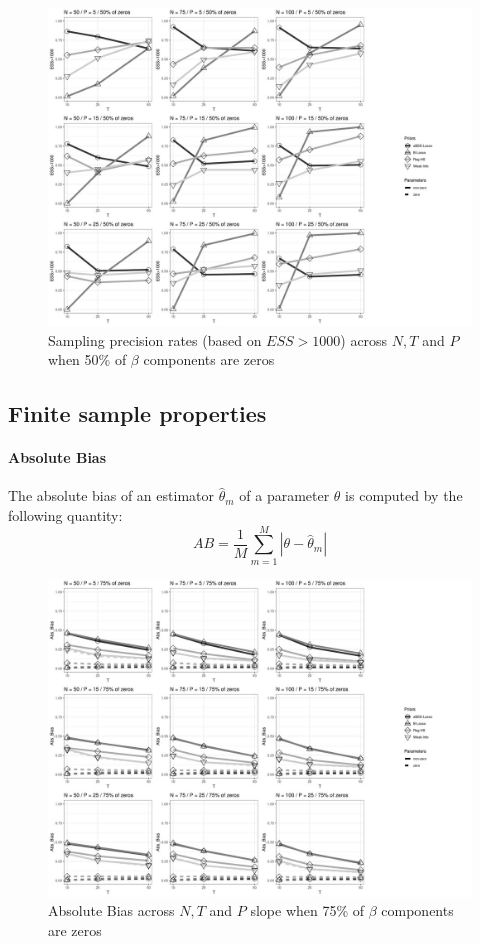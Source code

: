 \documentclass[a4paper,12pt]{article}
\begin{document}
\begin{figure}[]
\centering 
\includegraphics[width=18cm]{Prec1000_nz50_beta.jpg}
\caption{Sampling precision rates (based on $ESS>1000$) across $N, T$ and $P$ when 50\% of $\beta$ components are zeros}
\label{fig:Prec1000_nz50}
\end{figure}

\clearpage
\subsection*{Finite sample properties}
\paragraph*{Absolute Bias}
The absolute bias of an estimator $\hat{\theta}_m$ of a parameter $\theta$ is computed by the following  quantity:
\[  AB = \frac{1}{M} \sum_{m=1}^{M}|\theta-\hat{\theta}_m| \]

\begin{figure}[h]\label{fig:ABias_nz25}
\centering 
\includegraphics[width=18cm]{Abs_Bias_nz25_beta.jpg}
\caption{Absolute Bias across $N, T$ and $P$ slope when 75\% of $\beta$ components are zeros}
\end{figure}
\end{document}
